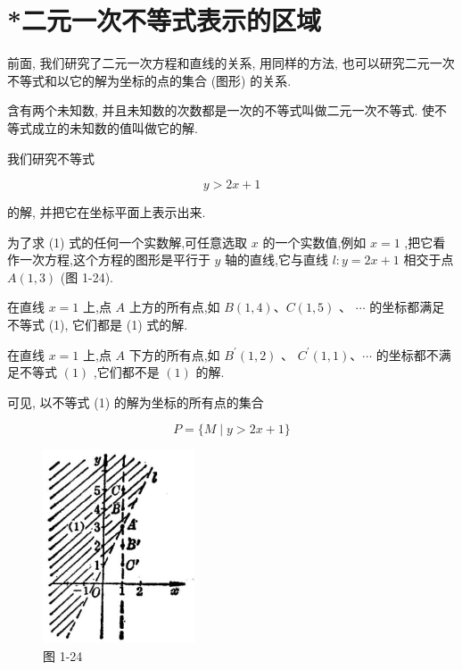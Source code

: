 \documentclass[lang=cn,newtx,10pt,scheme=chinese]{elegantbook}
\begin{document}
\section{*二元一次不等式表示的区域}

前面, 我们研究了二元一次方程和直线的关系, 用同样的方法, 也可以研究二元一次不等式和以它的解为坐标的点的集合 (图形) 的关系.

含有两个未知数, 并且未知数的次数都是一次的不等式叫做二元一次不等式. 使不等式成立的未知数的值叫做它的解.

我们研究不等式

\[
  y > {2x} + 1 \tag{1}
\]

的解, 并把它在坐标平面上表示出来.

为了求 (1) 式的任何一个实数解,可任意选取 \(x\) 的一个实数值,例如 \(x = 1\) ,把它看作一次方程,这个方程的图形是平行于 \(y\) 轴的直线,它与直线 \(l : y = {2x} + 1\) 相交于点 \(A\left( {1,3}\right)\) (图 1-24).

在直线 \(x = 1\) 上,点 \(A\) 上方的所有点,如 \(B\left( {1,4}\right) \text{、}C\left( {1,5}\right)\) 、 \(\cdots\) 的坐标都满足不等式 (1), 它们都是 (1) 式的解.

在直线 \(x = 1\) 上,点 \(A\) 下方的所有点,如 \({B}^{\prime }\left( {1,2}\right)\) 、 \({C}^{\prime }\left( {1,1}\right) \text{、}\cdots\) 的坐标都不满足不等式 \(\left( 1\right)\) ,它们都不是 \(\left( 1\right)\) 的解.

可见, 以不等式 (1) 的解为坐标的所有点的集合

\[
  P = \{ M \mid y > {2x} + 1\}
\]

\begin{figure}[h]
  \centering
  \includegraphics[max width=0.4\textwidth]{images/01912cc2-ffb6-728e-9ae7-b113ff05c64b_32_144093.jpg}
  \caption{图 1-24}
\end{figure}
\end{document}
